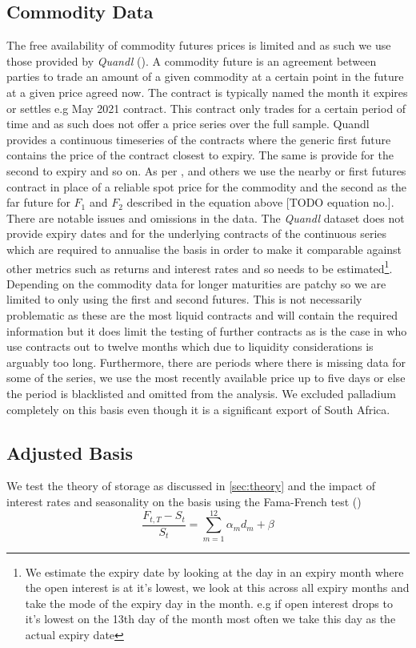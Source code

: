 \subsection{Commodity Data}
The free availability of commodity futures prices is limited and as such we use those provided by \textit{Quandl} (\cite{quandl}). A commodity future is an agreement between parties to trade an amount of a given commodity at a certain point in the future at a given price agreed now. The contract is typically named the month it expires or settles e.g May 2021 contract. This contract only trades for a certain period of time and as such does not offer a price series over the full sample. Quandl provides a continuous timeseries of the contracts where the generic first future contains the price of the contract closest to expiry. The same is provide for the second to expiry and so on. As per \cite{gorton2007}, \cite{ffamafrench} and others we use the nearby or first futures contract in place of a reliable spot price for the commodity and the second as the far future for $F_1$ and $F_2$ described in the equation above [TODO equation no.]. There are notable issues and omissions in the data. The \textit{Quandl} dataset does not provide expiry dates and for the underlying contracts of the continuous series which are required to annualise the basis in order to make it comparable against other metrics such as returns and interest rates and so needs to be estimated\footnote{We estimate the expiry date by looking at the day in an expiry month where the open interest is at it's lowest, we look at this across all expiry months and take the mode of the expiry day in the month. e.g if open interest drops to it's lowest on the 13th day of the month most often we take this day as the actual expiry date}. Depending on the commodity data for longer maturities are patchy so we are limited to only using the first and second futures. This is not necessarily problematic as these are the most liquid contracts and will contain the required information but it does limit the testing of further contracts as is the case in \cite{mainref} who use contracts out to twelve months which due to liquidity considerations is arguably too long. Furthermore, there are periods where there is missing data for some of the series, we use the most recently available price up to five days or else the period is blacklisted and omitted from the analysis. We excluded palladium completely on this basis even though it is a significant export of South Africa.

\subsection{Adjusted Basis}
We test the theory of storage as discussed in \autoref{sec:theory} and the impact of interest rates and seasonality on the basis using the Fama-French test (\cite{ffamafrench}) 
\begin{equation}
 \frac{F_{t,T} - S_t}{S_t} = \sum_{m=1}^{12} \alpha_m d_m + \beta
\end{equation}



